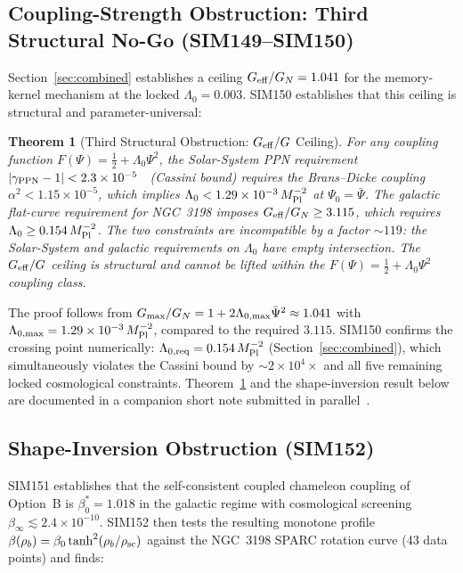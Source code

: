 \documentclass[12pt,a4paper]{article}
\newcommand{\Lz}{\Lambda_0}
\newcommand{\Mpl}{M_{\rm Pl}}
\newcommand{\Geff}{G_{\rm eff}}
\theoremstyle{plain}
\newtheorem{theorem}{Theorem}
\begin{document}
\subsection{Coupling-Strength Obstruction: Third Structural No-Go (SIM149--SIM150)}
\label{sec:theorem3}

Section~\ref{sec:combined} establishes a ceiling $\Geff/G_N = 1.041$ for the
memory-kernel mechanism at the locked $\Lz = 0.003$.  SIM150 establishes that this
ceiling is structural and parameter-universal:

\begin{theorem}[Third Structural Obstruction: $\Geff/G$ Ceiling]
\label{thm:geff-ceiling}
For any coupling function $F(\Psi) = \tfrac{1}{2} + \Lz\Psi^2$, the Solar-System
PPN requirement $|\gamma_{\rm PPN} - 1| < 2.3\times10^{-5}$~\cite{Bertotti2003}
(Cassini bound) requires the Brans--Dicke coupling $\alpha^2 < 1.15\times10^{-5}$,
which implies $\Lz < 1.29\times10^{-3}\,\Mpl^{-2}$ at $\Psi_0 = \bar\Psi$.
The galactic flat-curve requirement for NGC~3198 imposes $\Geff/G_N \geq 3.115$,
which requires $\Lz \geq 0.154\,\Mpl^{-2}$.  The two constraints are incompatible
by a factor $\sim119$: the Solar-System and galactic requirements on $\Lz$ have
empty intersection.  The $\Geff/G$ ceiling is structural and cannot be lifted
within the $F(\Psi) = \tfrac{1}{2} + \Lz\Psi^2$ coupling class.
\end{theorem}

The proof follows from $G_{\rm max}/G_N = 1 + 2\Lambda_{0,{\rm max}}\bar\Psi^2
\approx 1.041$ with $\Lambda_{0,{\rm max}} = 1.29\times10^{-3}\,\Mpl^{-2}$,
compared to the required $3.115$.  SIM150 confirms the crossing point numerically:
$\Lambda_{0,{\rm req}} = 0.154\,\Mpl^{-2}$ (Section~\ref{sec:combined}), which
simultaneously violates the Cassini bound by $\sim2\times10^4\times$ and all five
remaining locked cosmological constraints.  Theorem~\ref{thm:geff-ceiling} and the
shape-inversion result below are documented in a companion short note submitted in
parallel~\cite{WilsonCompNote}.

\subsection{Shape-Inversion Obstruction (SIM152)}
\label{sec:shapeinversion}

SIM151 establishes that the self-consistent coupled chameleon coupling of Option~B
is $\beta_0^* = 1.018$ in the galactic regime with cosmological screening
$\beta_\infty \lesssim 2.4\times10^{-10}$.  SIM152 then tests the resulting
monotone profile $\beta(\rho_b) = \beta_0\tanh^2(\rho_b/\rho_{\rm sc})$ against
the NGC~3198 SPARC rotation curve (43 data points) and finds:
\end{document}
